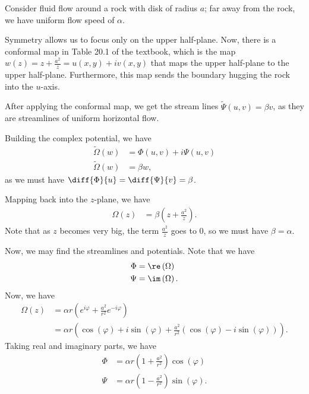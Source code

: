 \documentclass[10pt]{mypackage}
\begin{document}
\begin{example}
  Consider fluid flow around a rock with disk of radius $a$; far away from the rock, we have uniform flow speed of $\alpha$.\newline

  Symmetry allows us to focus only on the upper half-plane. Now, there is a conformal map in Table 20.1 of the textbook, which is the map $w(z) = z + \frac{a^2}{z} = u(x,y) + iv\left( x,y \right)$ that maps the upper half-plane to the upper half-plane. Furthermore, this map sends the boundary hugging the rock into the $u$-axis.\newline

  After applying the conformal map, we get the stream lines $\widetilde{\Psi}\left( u,v \right) = \beta v$, as they are streamlines of uniform horizontal flow.\newline

  Building the complex potential, we have
  \begin{align*}
    \widetilde{\Omega}\left( w \right) &= \Phi\left( u,v \right) + i\Psi\left( u,v \right)\\
    \widetilde{\Omega}\left( w \right) &= \beta w,
  \end{align*}
  as we must have $\diff{\Phi}{u} = \diff{\Psi}{v} = \beta$.\newline

  Mapping back into the $z$-plane, we have
  \begin{align*}
    \Omega\left( z \right) &= \beta\left( z + \frac{a^2}{z} \right).
  \end{align*}
  Note that as $z$ becomes very big, the term $\frac{a^2}{z}$ goes to $0$, so we must have $\beta = \alpha$.\newline

  Now, we may find the streamlines and potentials. Note that we have
  \begin{align*}
    \Phi &= \re\left( \Omega \right)\\
    \Psi &= \im\left( \Omega \right).
  \end{align*}
  Now, we have
  \begin{align*}
    \Omega\left( z \right) &= \alpha r\left( e^{i\varphi} + \frac{a^2}{r^2}e^{-i\varphi} \right)\\
                           &= \alpha r \left( \cos\left( \varphi \right) + i\sin\left( \varphi \right) + \frac{a^2}{r^2} \left( \cos\left( \varphi \right) - i\sin\left( \varphi \right) \right) \right).
  \end{align*}
  Taking real and imaginary parts, we have
  \begin{align*}
    \Phi &= \alpha r \left( 1 + \frac{a^2}{r^2} \right)\cos\left( \varphi \right)\\
    \Psi &= \alpha r \left( 1 - \frac{a^2}{r^2} \right)\sin\left( \varphi \right).
  \end{align*}
\end{example}
\end{document}
